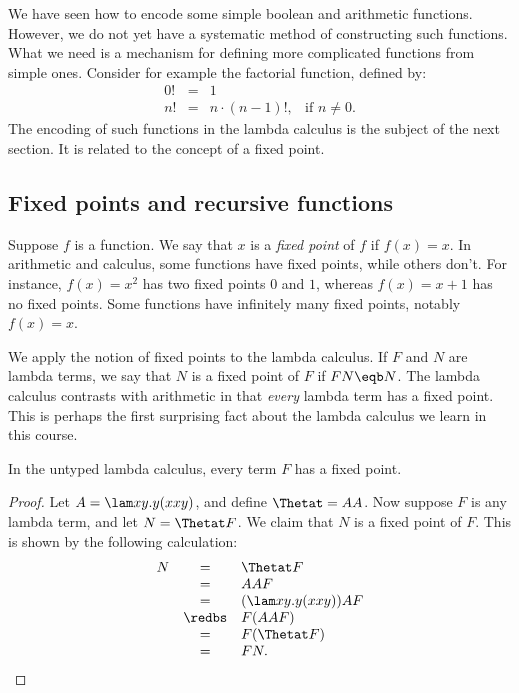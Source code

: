 \documentclass[12pt]{article}
\begin{document}
We have seen how to encode some simple boolean and arithmetic
functions. However, we do not yet have a systematic method of
constructing such functions. What we need is a mechanism for defining
more complicated functions from simple ones. Consider for example the
factorial function, defined by:
\[ \begin{array}{rcll}
  0! &=& 1 \\
  n! &=& n\cdot (n-1)!,& \mbox{if $n\neq 0$}.
\end{array}
\]
The encoding of such functions in the lambda calculus is the subject
of the next section. It is related to the concept of a fixed point.

\subsection{Fixed points and recursive functions}\label{subsec-fixed-points}

Suppose $f$ is a function. We say that $x$ is a {\em fixed point} of $f$
if $f(x)=x$. In arithmetic and calculus, some functions have
fixed points, while others don't. For instance, $f(x)=x^2$ has two
fixed points $0$ and $1$, whereas $f(x)=x+1$ has no fixed points. Some
functions have infinitely many fixed points, notably $f(x)=x$. 

We apply the notion of fixed points to the lambda calculus. If $F$ and
$N$ are lambda terms, we say that $N$ is a fixed point of $F$ if $FN\eqb
N$.  The lambda calculus contrasts with arithmetic in that {\em every}
lambda term has a fixed point. This is perhaps the first surprising fact
about the lambda calculus we learn in this course.

\begin{theorem}\label{thm-fix}
In the untyped lambda calculus, every term $F$ has a fixed point.
\end{theorem}

\begin{proof}
  Let $A=\lam xy.y(xxy)$, and define $\Thetat=AA$. Now suppose $F$ is
  any lambda term, and let $N=\Thetat F$. We claim that $N$ is a
  fixed point of $F$.  This is shown by the following calculation:
\[ \begin{array}{rcl}
  N 
  &=& \Thetat F \\
  &=& AA F \\
  &=& (\lam xy.y(xxy))AF \\
  &\redbs& F(AAF) \\
  &=& F(\Thetat F) \\
  &=& FN.
\end{array}
\]
\eottwo
\end{proof}
\end{document}
